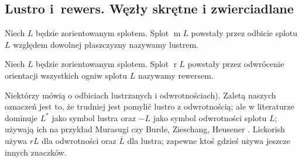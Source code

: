 
\subsection{Lustro i~rewers. Węzły skrętne i zwierciadlane}
\begin{definition}[lustro]
%
    Niech $L$ będzie zorientowanym splotem.
    Splot $\operatorname{m} L$ powstały przez odbicie splotu $L$ względem dowolnej płaszczyzny nazywamy lustrem.
\end{definition}

\begin{definition}[rewers]
%
%
    Niech $L$ będzie zorientowanym splotem.
    Splot $\operatorname{r} L$ powstały przez odwrócenie orientacji wszystkich ogniw splotu $L$ nazywamy rewersem.
\end{definition}

Niektórzy mówią o odbiciach lustrzanych i odwrotnościach).
Zaletą naszych oznaczeń jest to, że trudniej jest pomylić lustro z odwrotnością; ale w literaturze dominuje $L^*$ jako symbol lustra oraz $-L$ jako symbol odwrotności splotu $L$; używają ich na przykład Murasugi \cite[s. 14, 24]{murasugi1996} czy Burde, Zieschang, Heusener \cite{burde2014}.
Lickorish \cite[s. 4]{lickorish1997} używa $r L$ dla odwrotności oraz $\overline{L}$ dla lustra; zapewne ktoś gdzieś używa jeszcze innych znaczków.

